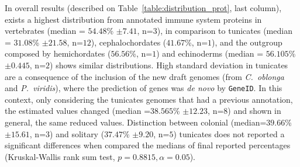 \documentclass[11pt]{article}
\begin{document}
In overall results (described on Table~\ref{table:distribution_prot}, last column),
exists a highest distribution from annotated immune system proteins 
in vertebrates (median = $54.48$\% $\pm 7.41$, n=$3$), in comparison to tunicates 
(median = $31.08$\% $\pm 21.58$, n=$12$), cephalochordates ($41.67$\%, n=$1$), and 
the outgroup composed by hemichordates ($56.56$\%, n=$1$) and echinoderms (median = 
$56.105$\% $\pm 0.445$, n=$2$) shows similar distributions. High standard deviation in 
tunicates are a consequence of the inclusion of the new draft genomes 
(from \textit{C.\ oblonga} and \textit{P.\ viridis}), where the prediction of genes 
was \textsl{de novo} by \texttt{GeneID}. In this context, only considering the tunicates 
genomes that had a previous annotation, the estimated values changed 
(median =$38.565$\% $\pm 12.23$, n=$8$) and shown in general, the same reduced values. 
Distinction between colonial (median=$39.66$\% $\pm 15.61$, n=$3$) and 
solitary ($37.47$\% $\pm 9.20$, n=$5$) tunicates does not reported a significant differences
when compared the medians of final reported percentages (Kruskal-Wallis rank sum test,
$p=0.8815, \alpha=0.05$).
\end{document}
